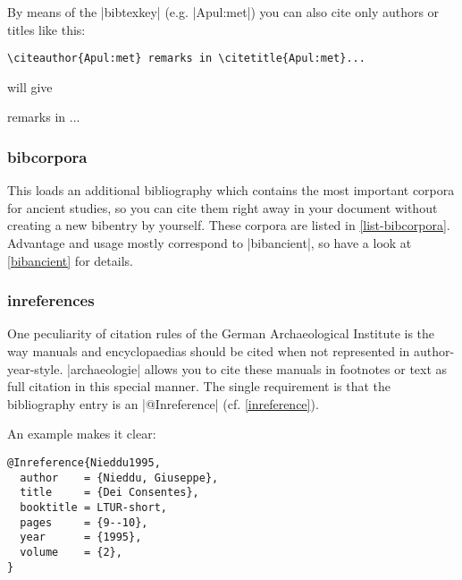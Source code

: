 \documentclass[a4paper,
10pt,
greek,
french,
spanish,
italian,
ngerman,
english
]{ltxdoc}
\begin{document}
\begin{refsection}
By means of the |bibtexkey| (e.g. |Apul:met|) you can also cite only authors or titles like this: 

\begin{lstlisting}
\citeauthor{Apul:met} remarks in \citetitle{Apul:met}...
\end{lstlisting}

will give
\begin{bsp}
\citeauthor{Apul:met} remarks in ...
\end{bsp}
\end{refsection}


\subsubsection{bibcorpora}\label{bibcorpora}
This loads an additional bibliography which contains the most important corpora for ancient studies, so you can cite them right away in your document without creating a new bibentry by yourself. 
These corpora are listed in \cref{list-bibcorpora}. 
Advantage and usage mostly correspond to |bibancient|, 
so have a look at \cref{bibancient} for details.

\subsubsection{inreferences}\label{inreferences}

One peculiarity of citation rules of the German Archaeological Institute 
is the way manuals and encyclopaedias should be cited when not represented in author-year-style. 
|archaeologie| allows you to cite these manuals in footnotes or text as full citation in this special manner.
The single requirement is that the bibliography entry is an |@Inreference|  (cf. \cref{inreference}).
 
An example makes it clear: 
\begin{lstlisting}[style=bibentry,label=Nieddu1995,caption={{@}Inreference\{Nieddu1995,…\} }]
@Inreference{Nieddu1995,
  author    = {Nieddu, Giuseppe},
  title     = {Dei Consentes},
  booktitle = LTUR-short,
  pages     = {9--10},
  year      = {1995},
  volume    = {2},
}
\end{lstlisting}
\end{document}
